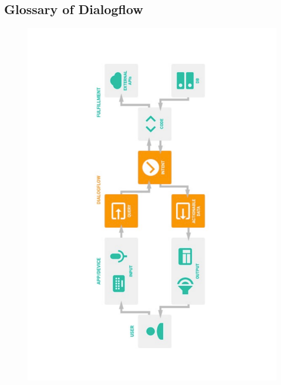 \documentclass[14pt,a4paper]{article}
\begin{document}
\subsection{Glossary of Dialogflow}
\begin{figure}[h]
\centering 
\includegraphics[angle=270,scale=.3]{dialogflowGlossary.pdf}
\end{figure}
\end{document}
